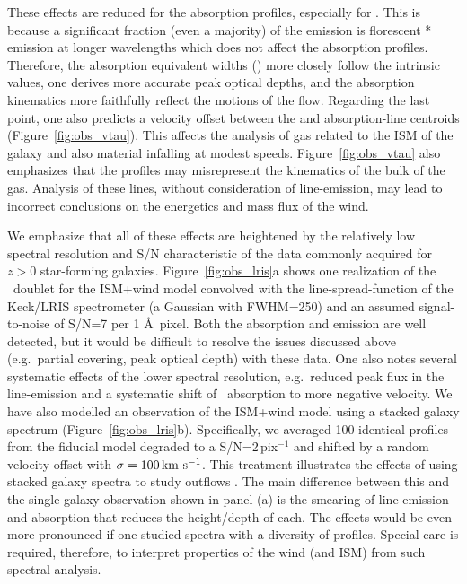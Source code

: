 \documentclass[12pt,preprint]{aastex}
\begin{document}
These effects %
are reduced
for the  absorption profiles, especially for \feiia.  This
is because a significant fraction (even a majority) of the
 emission is florescent * emission at longer
wavelengths which does not affect the absorption profiles. 
Therefore, the  absorption equivalent widths (\ewabs) more
closely follow the intrinsic values, one derives more accurate peak
optical depths, and the absorption kinematics more faithfully reflect
the motions of the flow.  Regarding the last point, one also
predicts a velocity offset between the  and 
absorption-line centroids (Figure~\ref{fig:obs_vtau}).
This affects the analysis of gas related to the ISM of the galaxy and
also material infalling at modest speeds.  
Figure~\ref{fig:obs_vtau} also emphasizes that
the  profiles may misrepresent the kinematics of the bulk of
the gas.  Analysis of these lines, without consideration of
line-emission, may lead to incorrect conclusions on the energetics
and mass flux of the wind.

We emphasize that all of these effects are heightened by the
relatively low spectral resolution and S/N characteristic of the data
commonly acquired for $z>0$ star-forming galaxies.  Figure~\ref{fig:obs_lris}a
shows one realization of the \mgiid\ doublet for the ISM+wind model
convolved with the line-spread-function of the Keck/LRIS spectrometer
(a Gaussian with FWHM=250\kms) and an assumed signal-to-noise of
S/N=7 per 1 \AA\ pixel.  Both the absorption
and emission are well detected, but it would be
difficult to resolve the issues discussed above (e.g.\ partial
covering, peak optical depth) with these data.  
One also notes several systematic effects of the lower spectral
resolution, e.g.\ reduced peak flux in the line-emission and a
systematic shift of \mgiia\ absorption to more negative velocity.
We have also modelled an observation of the ISM+wind model using
a stacked galaxy spectrum (Figure~\ref{fig:obs_lris}b).
Specifically, we
averaged 100 identical  profiles from the fiducial model
degraded to a S/N=2\,pix$^{-1}$ and shifted by a random velocity
offset with $\sigma = 100\, {\rm km~s^{-1}}$.  
This treatment illustrates the effects of using stacked galaxy 
spectra to study outflows
\citep[e.g.][S10]{wcp+09,rwk+10}.   The main difference %
between this and 
the
single galaxy observation shown in panel (a) is the smearing of
line-emission and absorption that reduces the height/depth of each.
The effects would be even more pronounced if one studied spectra with
a diversity of  profiles.    
Special care is required, therefore, to interpret properties of the wind (and
ISM) from such spectral analysis.
\end{document}
